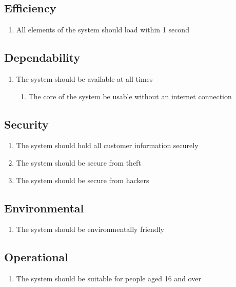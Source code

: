 \documentclass[a4paper]{report}
\begin{document}
\subsection{Efficiency}
\label{efficiency}
\begin{enumerate}[label=\ref*{efficiency}.\arabic*.,leftmargin=*]
\item All elements of the system should load within 1 second
\end{enumerate}
\subsection{Dependability}
\label{dependability}
\begin{enumerate}[label=\ref*{dependability}.\arabic*.,leftmargin=*]
\item The system should be available at all times
\begin{enumerate}[label*=\arabic*.]
\item The core of the system be usable without an internet connection
\end{enumerate}
\end{enumerate}
\subsection{Security}
\label{security}
\begin{enumerate}[label=\ref*{security}.\arabic*.,leftmargin=*]
\item The system should hold all customer information securely
\item The system should be secure from theft
\item The system should be secure from hackers
\end{enumerate}
\subsection{Environmental}
\label{environmental}
\begin{enumerate}[label=\ref*{environmental}.\arabic*.,leftmargin=*]
\item The system should be environmentally friendly
\end{enumerate}
\subsection{Operational}
\label{operational}
\begin{enumerate}[label=\ref*{operational}.\arabic*.,leftmargin=*]
\item The system should be suitable for people aged 16 and over
\end{enumerate}
\end{document}
